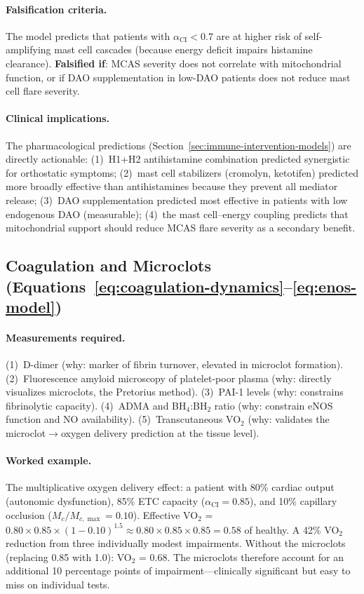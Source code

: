 \paragraph{Falsification criteria.}
The model predicts that patients with $\alpha_{\text{CI}} < 0.7$ are at higher risk of self-amplifying mast cell cascades (because energy deficit impairs histamine clearance). \textbf{Falsified if}: MCAS severity does not correlate with mitochondrial function, or if DAO supplementation in low-DAO patients does not reduce mast cell flare severity.

\paragraph{Clinical implications.}
The pharmacological predictions (Section~\ref{sec:immune-intervention-models}) are directly actionable: (1)~H1+H2 antihistamine combination predicted synergistic for orthostatic symptoms; (2)~mast cell stabilizers (cromolyn, ketotifen) predicted more broadly effective than antihistamines because they prevent all mediator release; (3)~DAO supplementation predicted most effective in patients with low endogenous DAO (measurable); (4)~the mast cell--energy coupling predicts that mitochondrial support should reduce MCAS flare severity as a secondary benefit.

\subsection{Coagulation and Microclots (Equations~\ref{eq:coagulation-dynamics}--\ref{eq:enos-model})}

\paragraph{Measurements required.}
(1)~D-dimer (why: marker of fibrin turnover, elevated in microclot formation).
(2)~Fluorescence amyloid microscopy of platelet-poor plasma (why: directly visualizes microclots, the Pretorius method).
(3)~PAI-1 levels (why: constrains fibrinolytic capacity).
(4)~ADMA and BH$_4$:BH$_2$ ratio (why: constrain eNOS function and NO availability).
(5)~Transcutaneous VO$_2$ (why: validates the microclot$\to$oxygen delivery prediction at the tissue level).

\paragraph{Worked example.}
The multiplicative oxygen delivery effect: a patient with 80\% cardiac output (autonomic dysfunction), 85\% ETC capacity ($\alpha_{\text{CI}} = 0.85$), and 10\% capillary occlusion ($M_c/M_{c,\max} = 0.10$). Effective VO$_2$ = $0.80 \times 0.85 \times (1 - 0.10)^{1.5} \approx 0.80 \times 0.85 \times 0.85 = 0.58$ of healthy. A 42\% VO$_2$ reduction from three individually modest impairments. Without the microclots (replacing 0.85 with 1.0): VO$_2$ = 0.68. The microclots therefore account for an additional 10 percentage points of impairment---clinically significant but easy to miss on individual tests.

